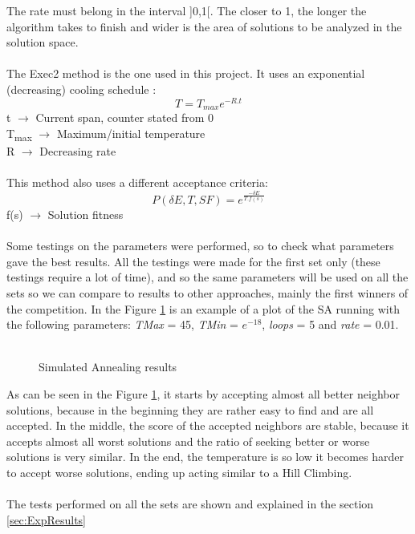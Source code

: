The rate must belong in the interval ]0,1[. The closer to 1, the longer the algorithm takes to finish and wider is the area of solutions to be analyzed in the solution space.\\
\\
The Exec2 method is the one used in this project. It uses an exponential (decreasing) cooling schedule \cite{CarvalhoLisbonNovember2004}:\\
\[T = T_{max}e^{-R.t} \]
t $\rightarrow$ Current span, counter stated from 0\\
T\textsubscript{max} $\rightarrow$ Maximum/initial temperature\\
R $\rightarrow$ Decreasing rate\\
\\
This method also uses a different acceptance criteria:\\
\[P(\delta E, T, SF) = e^{\frac{-\delta E}{T.f(s)}} \]
f(s) $\rightarrow$ Solution fitness\\
\\
Some testings on the parameters were performed, so to check what parameters gave the best results. All the testings were made for the first set only (these testings require a lot of time), and so the same parameters will be used on all the sets so we can compare to results to other approaches, mainly the first winners of the competition. 
In the Figure \ref{fig:SimulatedAnnealingPlot} is an example of a plot of the SA running with the following parameters: \textit{TMax} = 45, \textit{TMin} = $e^{-18}$, \textit{loops} = 5 and \textit{rate} = 0.01.\\
\\
\begin{figure}[!b]
\centering


\caption{Simulated Annealing results} 
\label{fig:SimulatedAnnealingPlot}
\end{figure}
As can be seen in the Figure \ref{fig:SimulatedAnnealingPlot}, it starts by accepting almost all better neighbor solutions, because in the beginning they are rather easy to find and are all accepted. In the middle, the score of the accepted neighbors are stable, because it accepts almost all worst solutions and the ratio of seeking better or worse solutions is very similar. In the end, the temperature is so low it becomes harder to accept worse solutions, ending up acting similar to a Hill Climbing.\\
\\
The tests performed on all the sets are shown and explained in the section \ref{sec:ExpResults}

